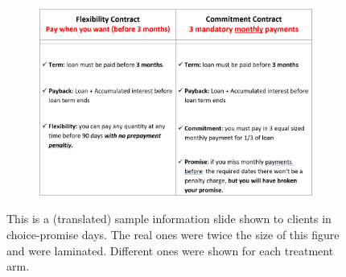 \documentclass[oneside,11pt]{article}
\begin{document}
\begin{figure}[H]
     \caption{Explanatory Material: Promise-Choice Days}
    \label{ExplanatoryMaterial}
    \begin{center}
    \begin{subfigure}{0.75\textwidth}
        \centering
        \includegraphics[width=\textwidth]{Figuras/MicaChoiceDonde.png}
    \end{subfigure}
    \end{center}
    \scriptsize
        This is a (translated) sample information slide shown to clients in choice-promise days. The real ones were twice the size of this figure and were laminated. Different ones were shown for each treatment arm.
\end{figure}
\end{document}
